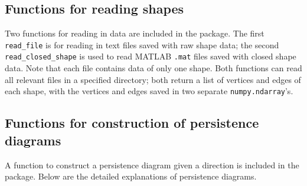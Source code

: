 \documentclass[codesnippet]{jss}
\begin{document}
\subsection{Functions for reading shapes}
Two functions for reading in data are included in the package. The first \texttt{read\_file} is for reading in text files saved with raw shape data; the second \texttt{read\_closed\_shape} is used to read MATLAB \texttt{.mat} files saved with closed shape data. Note that each file contains data of only one shape. Both functions can read all relevant files in a specified directory; both return a list of vertices and edges of each shape, with the vertices and edges saved in two separate \texttt{numpy.ndarray}'s.

\subsection{Functions for construction of persistence diagrams}
A function to construct a persistence diagram given a direction is included in the package. Below are the detailed explanations of persistence diagrams.
\end{document}
